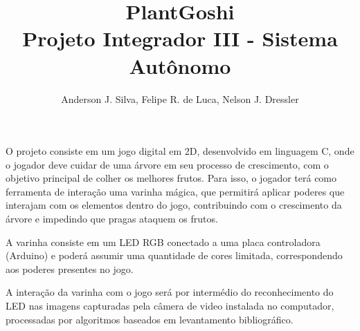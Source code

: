 \documentclass[12pt]{article}
\title{PlantGoshi\\ Projeto Integrador III - Sistema Aut\^onomo}
\author{Anderson J. Silva, Felipe R. de Luca, Nelson J. Dressler }
\begin{document}
 

\maketitle
     
\begin{resumo} 
 
 O projeto consiste em um jogo digital em 2D, desenvolvido em linguagem C, onde o jogador deve cuidar de uma
 \'arvore em seu processo de crescimento, com o objetivo principal de colher os melhores frutos.
 Para isso, o jogador ter\'a
 como ferramenta de intera\c c\~ao uma varinha m\'agica, que permitir\'a aplicar poderes
 que interajam com os elementos dentro do jogo, contribuindo
 com o crescimento da \'arvore e impedindo que pragas ataquem os frutos.  
 
 A varinha consiste em um LED RGB conectado a uma placa controladora (Arduino) e poder\'a
 assumir uma quantidade de cores limitada, correspondendo aos poderes presentes no jogo.
 
 A intera\c c\~ao da varinha com o jogo ser\'a por interm\'edio do reconhecimento do LED nas imagens capturadas pela
 c\^amera de video instalada no computador, processadas por algoritmos baseados em levantamento bibliogr\'afico.
 
\end{resumo}
\end{document}
